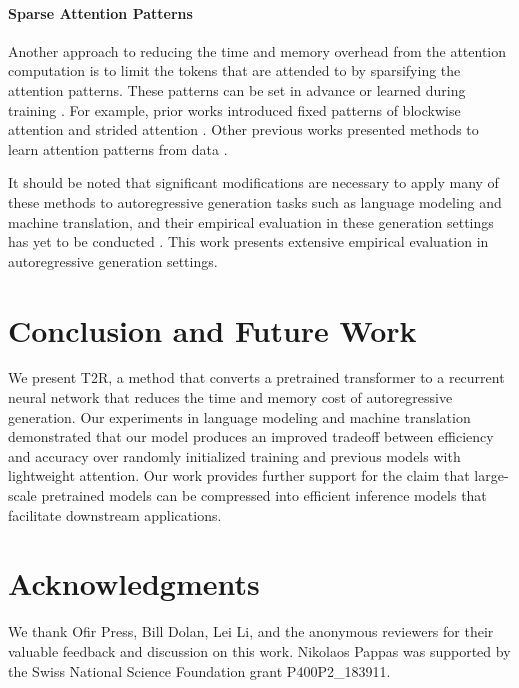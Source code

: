 \documentclass[11pt]{article}
\newcommand{\TRNN}{T2R\xspace}
\begin{document}
\paragraph{Sparse Attention Patterns}
Another approach to reducing the time and memory overhead from the attention computation is to limit the tokens that are attended to by sparsifying the attention patterns.
These patterns can be set in advance or learned during training \cite{Tay2020EfficientTA}.
For example, prior works introduced fixed patterns of blockwise attention \cite{qiu-etal-2020-blockwise} and strided attention \cite{Child2019,longformer,bigbird}.
Other previous works presented methods to learn attention patterns from data \cite{sukhbaatar-etal-2019-adaptive,context-based-sparse,sinkhorn}.

It should be noted that significant modifications are necessary to apply many of these methods to autoregressive generation tasks such as language modeling and machine translation, and their empirical evaluation in these generation settings has yet to be conducted \cite{RFA}.
This work presents extensive empirical evaluation in autoregressive generation settings.


\section{Conclusion and Future Work}
We present \TRNN, a method that converts a pretrained transformer to a recurrent neural network that reduces the time and memory cost of autoregressive generation.
Our experiments in language modeling and machine translation demonstrated that our model produces an improved tradeoff between efficiency and accuracy over randomly initialized training and previous models with lightweight attention.
Our work provides further support for the claim that large-scale pretrained models can be compressed into efficient inference models that facilitate downstream applications.

\section*{Acknowledgments}
We thank Ofir Press, Bill Dolan, Lei Li, and the anonymous reviewers for their valuable feedback and discussion on this work. Nikolaos Pappas was supported by the Swiss National Science Foundation grant P400P2\_183911.





\appendix
\newpage
\newpage
\end{document}
